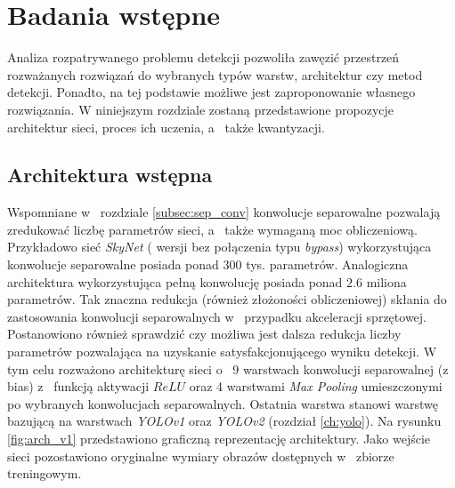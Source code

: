 \chapter{Badania wstępne}
\label{cha:Badania wstępne}

Analiza rozpatrywanego problemu detekcji pozwoliła zawęzić przestrzeń rozważanych rozwiązań do wybranych typów warstw, architektur czy metod detekcji. 
Ponadto, na tej podstawie możliwe jest zaproponowanie własnego rozwiązania.
W niniejszym rozdziale zostaną przedstawione propozycje architektur sieci, proces ich uczenia, a~ także kwantyzacji. 

\section{Architektura wstępna}

Wspomniane w~ rozdziale \ref{subsec:sep_conv} konwolucje separowalne pozwalają zredukować liczbę parametrów sieci, a~ także wymaganą moc obliczeniową.
Przykładowo sieć \emph{SkyNet} ( wersji bez połączenia typu \emph{bypass}) wykorzystująca konwolucje separowalne posiada ponad $300$ tys. parametrów. 
Analogiczna architektura wykorzystująca pełną konwolucję posiada ponad $2.6$ miliona parametrów.
Tak znaczna redukcja (również złożoności obliczeniowej) skłania do zastosowania konwolucji separowalnych w~ przypadku akceleracji sprzętowej. 
Postanowiono również sprawdzić czy możliwa jest dalsza redukcja liczby parametrów pozwalająca na uzyskanie satysfakcjonującego wyniku detekcji.  
W tym celu rozważono architekturę sieci o~ 9 warstwach konwolucji separowalnej (z bias) z~ funkcją aktywacji $ReLU$ oraz  4 warstwami \emph{Max Pooling} umieszczonymi po wybranych konwolucjach separowalnych.
Ostatnia warstwa stanowi warstwę bazującą na warstwach \emph{YOLOv1} oraz \emph{YOLOv2} (rozdział \ref{ch:yolo}). 
Na rysunku \ref{fig:arch_v1} przedstawiono graficzną reprezentację architektury. 
Jako wejście sieci pozostawiono oryginalne wymiary obrazów dostępnych w~ zbiorze treningowym.

